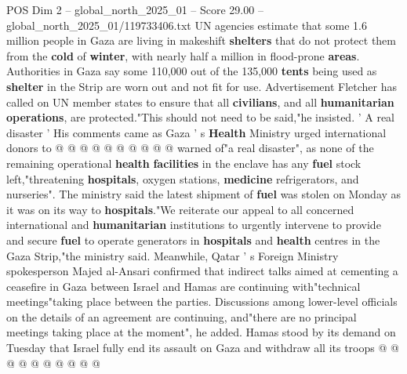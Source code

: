 \begin{textsample}{POS Dim 2 – global\_north\_2025\_01 – Score 29.00 – global\_north\_2025\_01/119733406.txt}
UN agencies estimate that some 1.6 million people in Gaza are living in makeshift \textbf{shelters} that do not protect them from the \textbf{cold} of \textbf{winter}, with nearly half a million in flood-prone \textbf{areas}.
Authorities in Gaza say some 110,000 out of the 135,000 \textbf{tents} being used as \textbf{shelter} in the Strip are worn out and not fit for use.
Advertisement Fletcher has called on UN member states to ensure that all \textbf{civilians}, and all \textbf{humanitarian} \textbf{operations}, are protected."This should not need to be said,"he insisted. ' A real disaster ' His comments came as Gaza ' s \textbf{Health} Ministry urged international donors to @ @ @ @ @ @ @ @ @ @ warned of"a real disaster", as none of the remaining operational \textbf{health} \textbf{facilities} in the enclave has any \textbf{fuel} stock left,"threatening \textbf{hospitals}, oxygen stations, \textbf{medicine} refrigerators, and nurseries".
The ministry said the latest shipment of \textbf{fuel} was stolen on Monday as it was on its way to \textbf{hospitals}."We reiterate our appeal to all concerned international and \textbf{humanitarian} institutions to urgently intervene to provide and secure \textbf{fuel} to operate generators in \textbf{hospitals} and \textbf{health} centres in the Gaza Strip,"the ministry said.
Meanwhile, Qatar ' s Foreign Ministry spokesperson Majed al-Ansari confirmed that indirect talks aimed at cementing a ceasefire in Gaza between Israel and Hamas are continuing with"technical meetings"taking place between the parties.
Discussions among lower-level officials on the details of an agreement are continuing, and"there are no principal meetings taking place at the moment", he added.
Hamas stood by its demand on Tuesday that Israel fully end its assault on Gaza and withdraw all its troops @ @ @ @ @ @ @ @ @ @

\end{textsample}
